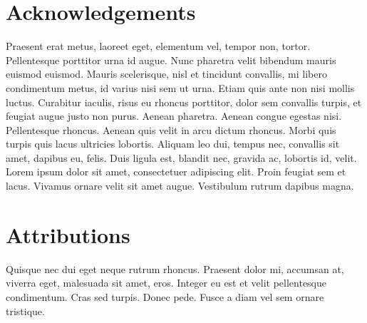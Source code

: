 \section*{Acknowledgements}
Praesent erat metus, laoreet eget, elementum vel, tempor non, tortor. Pellentesque porttitor urna id augue. Nunc pharetra velit bibendum mauris euismod euismod. Mauris scelerisque, nisl et tincidunt convallis, mi libero condimentum metus, id varius nisi sem ut urna. Etiam quis ante non nisi mollis luctus. Curabitur iaculis, risus eu rhoncus porttitor, dolor sem convallis turpis, et feugiat augue justo non purus. Aenean pharetra. Aenean congue egestas nisi. Pellentesque rhoncus. Aenean quis velit in arcu dictum rhoncus. Morbi quis turpis quis lacus ultricies lobortis. Aliquam leo dui, tempus nec, convallis sit amet, dapibus eu, felis. Duis ligula est, blandit nec, gravida ac, lobortis id, velit. Lorem ipsum dolor sit amet, consectetuer adipiscing elit. Proin feugiat sem et lacus. Vivamus ornare velit sit amet augue. Vestibulum rutrum dapibus magna.

\bigskip

\section*{Attributions}
Quisque nec dui eget neque rutrum rhoncus. Praesent dolor mi, accumsan at, viverra eget, malesuada sit amet, eros. Integer eu est et velit pellentesque condimentum. Cras sed turpis. Donec pede. Fusce a diam vel sem ornare tristique.

